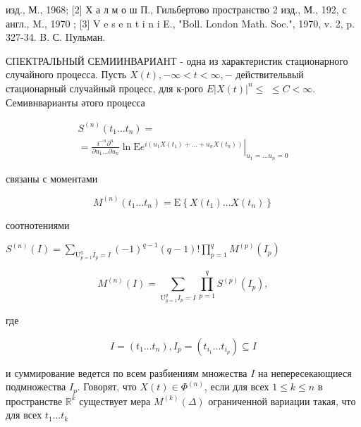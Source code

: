 \documentclass[10pt]{article}
\begin{document}
изд., М., 1968; [2] Х а л м о ш П., Гильбертово пространство 2 изд., М., 192, с англ., M., 1970 ; [3] V e s e n t i n i E., "Boll. London Math. Soc.", 1970, v. 2, p. 327-34. B. С. IIульман.



СПЕКТРАЛЬНЫЙ СЕМИИНВАРИАНТ - одна из характеристик стационарного случайного процесса. Пусть $X(t),-\infty<t<\infty,-$ действительвый стационарный случайный процесс, для к-рого $E|X(t)|^{n} \leqslant$ $\leqslant C<\infty$. Семивнварианты әтого процесса



\[

\begin{gathered}

S^{(n)}\left(t_{1} \ldots t_{n}\right)= \\

=\left.\frac{i^{-n} \partial^{n}}{\partial u_{1} \ldots \partial u_{n}} \ln \mathrm{E} e^{i\left(u_{1} X\left(t_{1}\right)+\ldots+u_{n} X\left(t_{n}\right)\right)}\right|_{u_{1}=\ldots u_{n}=0}

\end{gathered}

\]



связаны с моментами



\[

M^{(n)}\left(t_{1} \ldots t_{n}\right)=\mathrm{E}\left\{X\left(t_{1}\right) \ldots X\left(t_{n}\right)\right\}

\]



соотнотениями



$S^{(n)}(I)=\sum_{\mathrm{U}_{p=1}^{q} I_{p}=I}(-1)^{q-1}(q-1) ! \prod_{p=1}^{q} M^{(p)}\left(I_{p}\right)$



\[

M^{(n)}(I)=\sum_{\mathrm{U}_{p=1}^{q} I_{p}=I} \prod_{p=1}^{q} S^{(p)}\left(I_{p}\right),

\]



где



\[

I=\left(t_{1} \ldots t_{n}\right), I_{p}=\left(t_{i_{1}} \ldots t_{i_{p}}\right) \subseteq I

\]



и суммирование ведется по всем разбиениям множества $I$ на непересекающиеся подмножества $I_{p}$. Говорят, что $X(t) \in \Phi^{(n)}$, если для всех $1 \leqslant k \leqslant n$ в пространстве $\mathbb{R}^{k}$ существует мера $M^{(k)}(\Delta)$ ограниченной вариации такая, что для всех $t_{1} \ldots t_{k}$
\end{document}
